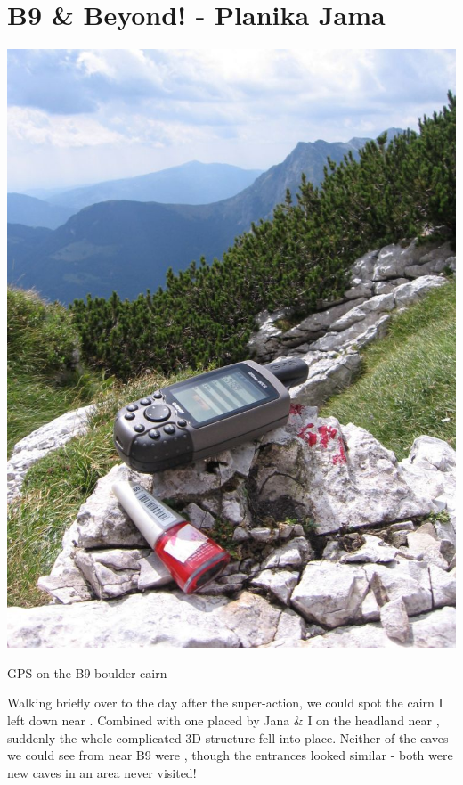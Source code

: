 \section{B9 \& Beyond! - Planika Jama}

\begin{marginfigure}
\checkoddpage \ifoddpage \forcerectofloat \else \forceversofloat \fi
\centering
 \includegraphics[width=\linewidth]{2007/b9/jarvist frost - b9 boulder cairn gps--orig.jpg} 
 \caption{GPS on the B9 boulder cairn }
\end{marginfigure}



Walking briefly over to  the day after the super-action, we could spot
the cairn I left down near . Combined with one placed by
Jana \& I on the headland near , suddenly the whole complicated 3D
structure fell into place. Neither of the caves we could see from near
B9 were , though the entrances looked similar - both
were new caves in an area never visited!

